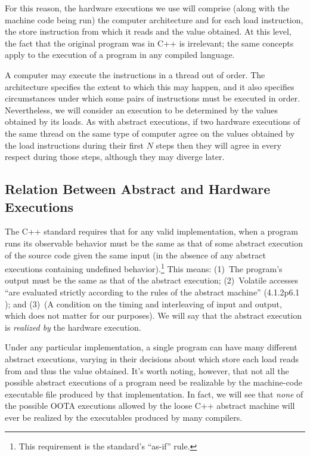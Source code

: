 For this reason, the hardware executions we use will comprise (along
with the machine code being run) the computer architecture and for each
load instruction, the store instruction from which it reads and the
value obtained.
At this level, the fact that the original program was in C++ is
irrelevant; the same concepts apply to the execution of a program in
any compiled language.

A computer may execute the instructions in a thread out of order.
The architecture specifies the extent to which this may happen, and it
also specifies circumstances under which some pairs of instructions
must be executed in order.
Nevertheless, we will consider an execution to be determined by the
values obtained by its loads.
As with abstract executions, if two hardware executions of the same
thread on the same type of computer agree on the values obtained by
the load instructions during their first $N$ steps then they will
agree in every respect during those steps, although they may diverge
later.

\subsection{Relation Between Abstract and Hardware Executions}
\label{sec:Relation Between Abstract and Hardware Executions}

The C++ standard requires that for any valid implementation, when a
program runs its observable behavior must be the same as that of some
abstract execution of the source code given the same input (in the
absence of any abstract executions containing undefined behavior).\footnote{
	This requirement is the standard's ``as-if'' rule.}
This means:
(1)~The program's output must be the same as that of the abstract execution;
(2)~Volatile accesses ``are evaluated strictly according to the
rules of the abstract machine'' (4.1.2p6.1 ); and
(3)~(A condition on the timing and interleaving of input and output,
which does not matter for our purposes).
We will say that the abstract execution is \emph{realized by} the
hardware execution.

Under any particular implementation,
a single program can have many different abstract executions,
varying in their decisions about which store each load reads from
and thus the value obtained.
It's worth noting, however, that not all the possible abstract executions
of a program need be realizable by the machine-code executable file
produced by that implementation.
In fact, we will see that \emph{none} of the possible OOTA executions
allowed by the loose C++ abstract machine will ever be realized
by the executables produced by many compilers.

